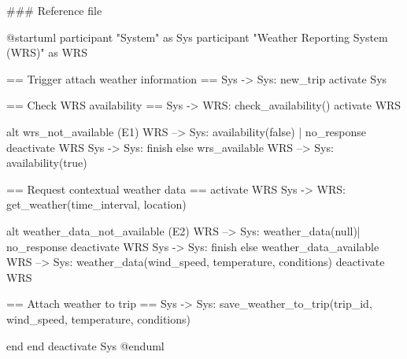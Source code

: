 ### Reference file


@startuml
participant "System" as Sys
participant "Weather Reporting System (WRS)" as WRS

== Trigger attach weather information ==
Sys -> Sys: new_trip
activate Sys


== Check WRS availability ==
Sys -> WRS: check_availability()
activate WRS

alt wrs_not_available (E1)
    WRS --> Sys: availability(false) | no_response
    deactivate WRS
    Sys -> Sys: finish
else wrs_available
    WRS --> Sys: availability(true)

    == Request contextual weather data ==
    activate WRS
    Sys -> WRS: get_weather(time_interval, location)

    alt weather_data_not_available (E2)
        WRS --> Sys: weather_data(null)| no_response
        deactivate WRS
        Sys -> Sys: finish
    else weather_data_available
        WRS --> Sys: weather_data(wind_speed, temperature, conditions)
        deactivate WRS

        == Attach weather to trip ==
        Sys -> Sys: save_weather_to_trip(trip_id, wind_speed, temperature, conditions)
        
    end
end
deactivate Sys
@enduml